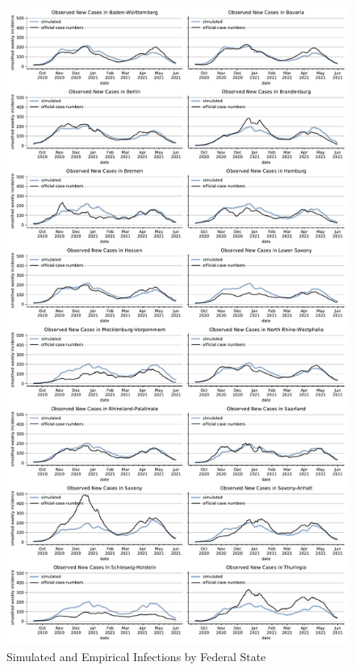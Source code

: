 \begin{figure}[ht]
  \centering
  \includegraphics[width=\textwidth]{../figures/results/figures/incidences_by_group/state/full_combined_baseline_new_known_case}
  \caption{Simulated and Empirical Infections by Federal State}
  \label{fig:state_fit}
\end{figure}




